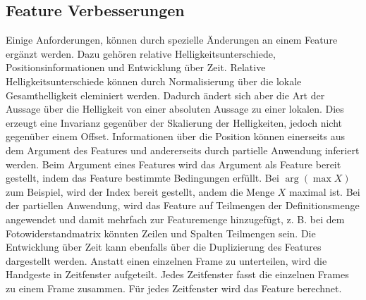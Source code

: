 \subsection{Feature Verbesserungen}
Einige Anforderungen, können durch spezielle Änderungen an einem Feature ergänzt werden. Dazu gehören relative Helligkeitsunterschiede, Positionsinformationen und Entwicklung über Zeit.
\newline
\newline
Relative Helligkeitsunterschiede können durch Normalisierung über die lokale Gesamthelligkeit eleminiert werden. Dadurch ändert sich aber die Art der Aussage über die Helligkeit von einer absoluten Aussage
zu einer lokalen. Dies erzeugt eine Invarianz gegenüber der Skalierung der Helligkeiten, jedoch nicht gegenüber einem Offset.
\newline
\newline
Informationen über die Position können einerseits aus dem Argument des Features und andererseits durch partielle Anwendung inferiert werden. Beim Argument eines Features wird das Argument als Feature bereit
gestellt, indem das Feature bestimmte Bedingungen erfüllt. Bei $\arg(\max X)$ zum Beispiel, wird der Index bereit gestellt, andem die Menge $X$ maximal ist. Bei der partiellen Anwendung, wird das Feature auf
Teilmengen der Definitionsmenge angewendet und damit mehrfach zur Featuremenge hinzugefügt, z. B. bei dem Fotowiderstandmatrix könnten Zeilen und Spalten Teilmengen sein.
\newline
\newline
Die Entwicklung über Zeit kann ebenfalls über die Duplizierung des Features dargestellt werden. Anstatt einen einzelnen Frame zu unterteilen, wird die Handgeste in Zeitfenster aufgeteilt. Jedes Zeitfenster
fasst die einzelnen Frames zu einem Frame zusammen. Für jedes Zeitfenster wird das Feature berechnet.